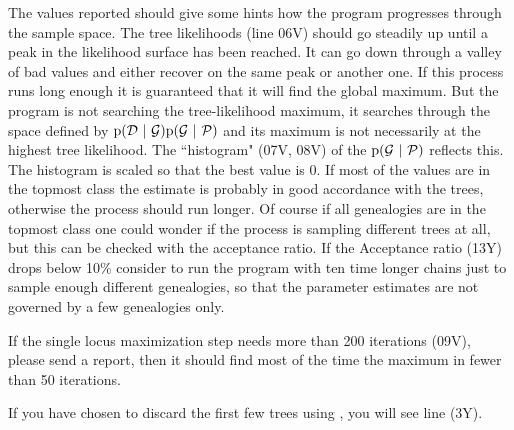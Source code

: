 The values reported should give some hints how the program progresses 
through the sample space.  The tree likelihoods (line 06V) should go 
steadily up until a peak in the likelihood surface has been reached. 
It can go down through a valley of bad values and either recover on the 
same peak or another one. If this process runs long enough it is 
guaranteed that it will find the global maximum.  But the program is not 
searching the tree-likelihood maximum, it searches through the space 
defined by $\prob(\mathcal D\ |\ \G) \prob(\G\ |\ \P)$ 
and its maximum is not necessarily at the highest tree likelihood. 
The ``histogram" (07V, 08V) of the $ {\rm p}(\mathcal{G}\ |\ \mathcal{P})$ reflects this. 
The histogram is scaled so that the best value is 0. 
If most of the values are in the topmost class the estimate is
probably in good accordance with the trees, otherwise the process
should run longer.  Of course if all genealogies are in the topmost
class one could wonder if the process is sampling different trees at
all, but this can be checked with the acceptance ratio.  If the
Acceptance ratio (13Y) drops below 10\% consider to run the program
with ten time longer chains just to sample enough different
genealogies, so that the parameter estimates are not governed by a few
genealogies only.  
\par 
If the single locus maximization step needs
more than 200 iterations (09V), please send a report, then it should
find most of the time the maximum in fewer than 50 iterations.  
\par
If you have chosen to discard the first few trees using
{}, you will see line (3Y).

